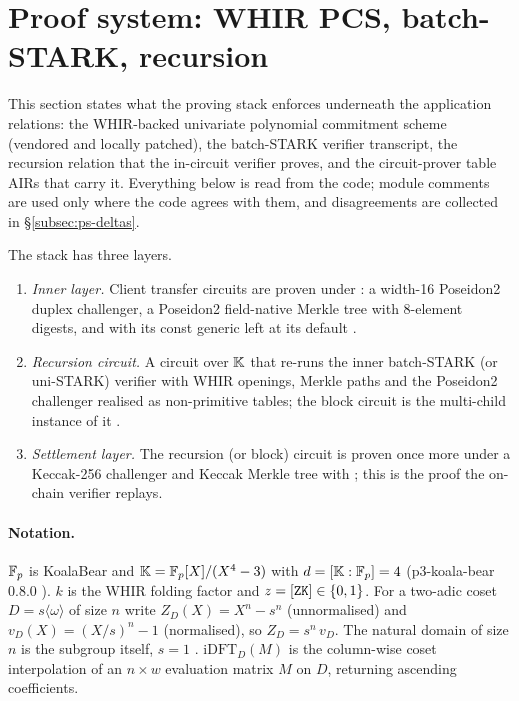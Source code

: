 \section{Proof system: WHIR PCS, batch-STARK, recursion}
\label{sec:proof-system}

This section states what the proving stack enforces underneath the application
relations: the WHIR-backed univariate polynomial commitment scheme (vendored and
locally patched), the batch-STARK verifier transcript, the recursion relation that
the in-circuit verifier proves, and the circuit-prover table AIRs that carry it.
Everything below is read from the code; module comments are used only where the
code agrees with them, and disagreements are collected in
\S\ref{subsec:ps-deltas}.

The stack has three layers.
\begin{enumerate}
\item \emph{Inner layer.} Client transfer circuits are proven under
   : a width-16
  Poseidon2 duplex challenger, a Poseidon2 field-native Merkle tree with
  8-element digests, and  with its const generic  left
  at its default 
  .
\item \emph{Recursion circuit.} A circuit over $\mathbb{K}$ that re-runs the inner
  batch-STARK (or uni-STARK) verifier with WHIR openings, Merkle paths and the
  Poseidon2 challenger realised as non-primitive tables; the block circuit is
  the multi-child instance of it
  .
\item \emph{Settlement layer.} The recursion (or block) circuit is proven once
  more under a Keccak-256 challenger and Keccak Merkle tree with 
   
   ;
  this is the proof the on-chain verifier replays.
\end{enumerate}

\paragraph{Notation.}
$\mathbb{F}_p$ is KoalaBear and $\mathbb{K} = \mathbb{F}_p[X]/(X^4-3)$ with $d = [\mathbb{K}:\mathbb{F}_p] = 4$
 (p3-koala-bear 0.8.0
). $k$ is the WHIR folding factor and
$z = [\texttt{ZK}] \in \{0,1\}$. For a two-adic coset $D = s\langle\omega\rangle$
of size $n$ write $Z_D(X) = X^n - s^n$ (unnormalised) and
$v_D(X) = (X/s)^n - 1$ (normalised), so $Z_D = s^n\, v_D$. The natural domain
of size $n$ is the subgroup itself, $s = 1$
.
$\mathrm{iDFT}_D(M)$ is the column-wise coset interpolation of an
$n\times w$ evaluation matrix $M$ on $D$, returning ascending coefficients.

